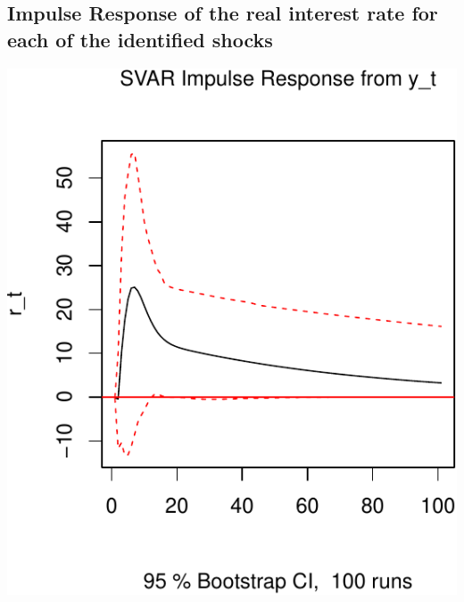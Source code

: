 \documentclass[11pt,preprint, authoryear]{elsarticle}
\numberwithin{equation}{section}
\numberwithin{figure}{section}
\numberwithin{table}{section}
\begin{document}
\hypertarget{impulse-response-of-the-real-interest-rate-for-each-of-the-identified-shocks}{%
\subsection{Impulse Response of the real interest rate for each of the
identified
shocks}\label{impulse-response-of-the-real-interest-rate-for-each-of-the-identified-shocks}}

\includegraphics{TS_proj_files/figure-latex/unnamed-chunk-17-1.pdf}
\end{document}
